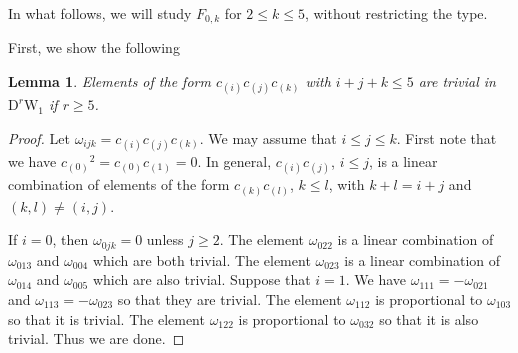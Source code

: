 \documentclass[12pt]{amsart}
\newcommand{\W}{\mathrm{W}}
\newcommand{\D}{\mathrm{D}}
\newtheorem{lemma}[theorem]{Lemma}
\theoremstyle{definition}
\theoremstyle{remark}
\begin{document}
In what follows, we will study $F_{0,k}$ for $2\leq k\leq 5$, without restricting the type.

First, we show the following

\begin{lemma}
\label{lem10.8}
Elements of the form $c_{(i)}c_{(j)}c_{(k)}$ with $i+j+k\leq5$ are trivial in~$\D^r\W_1$ if $r\geq5$.
\end{lemma}
\begin{proof}
Let $\omega_{ijk}=c_{(i)}c_{(j)}c_{(k)}$.
We may assume that $i\leq j\leq k$.
First note that we have $c_{(0)}{}^2=c_{(0)}c_{(1)}=0$.
In general, $c_{(i)}c_{(j)}$, $i\leq j$, is a linear combination of elements of the form $c_{(k)}c_{(l)}$, $k\leq l$, with $k+l=i+j$ and $(k,l)\neq(i,j)$.

If $i=0$, then $\omega_{0jk}=0$ unless $j\geq2$.
The element $\omega_{022}$ is a linear combination of $\omega_{013}$ and $\omega_{004}$ which are both trivial.
The element $\omega_{023}$ is a linear combination of $\omega_{014}$ and $\omega_{005}$ which are also trivial.
Suppose that $i=1$.
We have $\omega_{111}=-\omega_{021}$ and $\omega_{113}=-\omega_{023}$ so that they are trivial.
The element $\omega_{112}$ is proportional to $\omega_{103}$ so that it is trivial.
The element $\omega_{122}$ is proportional to $\omega_{032}$ so that it is also trivial.
Thus we are done.
\end{proof}
\end{document}
